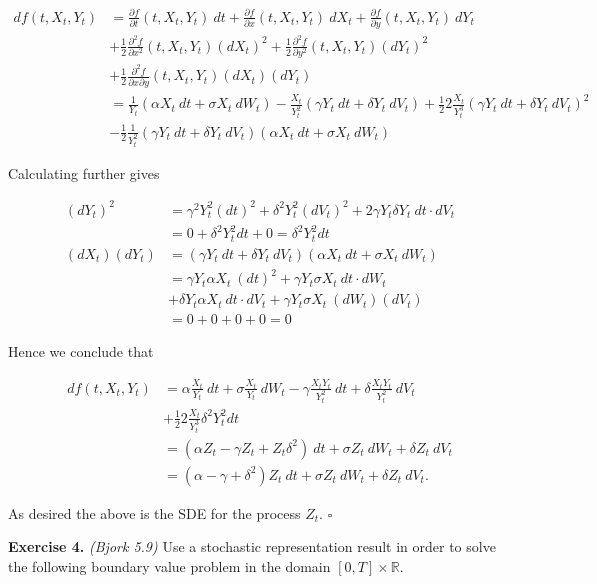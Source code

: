 \documentclass[
]{article}
\begin{document}
\begin{align*}
df(t,X_t,Y_t)&=\frac{\partial f}{\partial t}(t,X_t,Y_t)\ dt + \frac{\partial f}{\partial x}(t,X_t,Y_t)\ dX_t + \frac{\partial f}{\partial y}(t,X_t,Y_t)\ dY_t\\
&+\frac{1}{2}\frac{\partial^2 f}{\partial x^2}(t,X_t,Y_t)(dX_t)^2 + \frac{1}{2}\frac{\partial^2 f}{\partial y^2}(t,X_t,Y_t)(dY_t)^2\\
&+\frac{1}{2}\frac{\partial^2 f}{\partial x\partial y}(t,X_t,Y_t)(dX_t)(dY_t)\\
&=\frac{1}{Y_t}(\alpha X_t\ dt + \sigma X_t\ dW_t)-\frac{X_t}{Y_t^2}(\gamma Y_t\ dt+\delta Y_t\ dV_t)+\frac{1}{2}2\frac{X_t}{Y_t^3}(\gamma Y_t\ dt+\delta Y_t\ dV_t)^2\\
&-\frac{1}{2}\frac{1}{Y_t^2}(\gamma Y_t\ dt+\delta Y_t\ dV_t)(\alpha X_t\ dt + \sigma X_t\ dW_t)
\end{align*}

Calculating further gives

\begin{align*}
(dY_t)^2&=\gamma^2 Y_t^2 (dt)^2+\delta^2Y_t^2 (dV_t)^2+2\gamma Y_t\delta Y_t\ dt\cdot dV_t\\
&=0 +\delta^2Y_t^2 dt + 0=\delta^2Y_t^2 dt\\
(dX_t)(dY_t)&=(\gamma Y_t\ dt+\delta Y_t\ dV_t)(\alpha X_t\ dt + \sigma X_t\ dW_t)\\
&=\gamma Y_t \alpha X_t\ (dt)^2 +\gamma Y_t\sigma X_t\ dt\cdot dW_t\\
&+\delta Y_t \alpha X_t\ dt\cdot dV_t+\gamma Y_t\sigma X_t\ (dW_t)(dV_t)\\
&=0+0+0+0=0
\end{align*}

Hence we conclude that

\begin{align*}
df(t,X_t,Y_t)&=\alpha\frac{X_t}{Y_t}\ dt + \sigma \frac{X_t}{Y_t}\ dW_t-\gamma \frac{X_tY_t}{Y_t^2}\ dt+\delta \frac{X_tY_t}{Y_t^2}\ dV_t\\
&+\frac{1}{2}2\frac{X_t}{Y_t^3}\delta^2Y_t^2 dt\\
&=\left(\alpha Z_t-\gamma Z_t+Z_t\delta^2\right)\ dt+ \sigma Z_t\ dW_t+\delta Z_t\ dV_t\\
&=\left(\alpha -\gamma +\delta^2\right)Z_t\ dt+ \sigma Z_t\ dW_t+\delta Z_t\ dV_t.
\end{align*}

As desired the above is the SDE for the process \(Z_t\). \(\square\)

\textbf{Exercise 4.} \emph{(Bjork 5.9)} Use a stochastic representation
result in order to solve the following boundary value problem in the
domain \([0,T]\times\mathbb{R}\).
\end{document}
